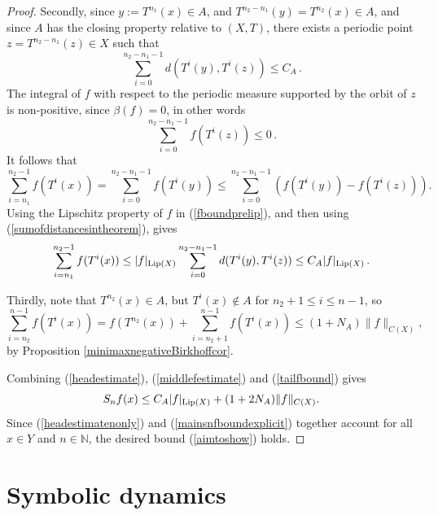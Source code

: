 \documentclass[reqno,11pt]{amsart}
\theoremstyle{definition}
\theoremstyle{remark}
\theoremstyle{remark}
\def \N {\mathbb N}
\def\lip{{\rm Lip}}
\numberwithin{equation}{section}
\begin{document}
\begin{proof}
Secondly, since $y:=T^{n_1}(x)\in A$, and $T^{n_2-n_1}(y)=T^{n_2}(x)\in A$,
and since $A$ has
the closing property relative to $(X,T)$, there exists a periodic point $z=T^{n_2-n_1}(z)\in X$ 
such that
\begin{equation}\label{sumofdistancesintheorem}
\sum_{i=0}^{n_2-n_1-1} d\left(T^i(y), T^i(z)\right) \le C_A\,.
\end{equation}
The integral of $f$ with respect to the periodic measure supported by the orbit of $z$ is non-positive,
since
$\beta(f)=0$,
in other words
\begin{equation}\label{gperiodicnonpositive}
\sum_{i=0}^{n_2-n_1-1}f(T^i(z)) \le 0\,.
\end{equation}
It follows that
\begin{equation}\label{fboundprelip}
\sum_{i=n_1}^{n_2-1} f(T^i(x))
=
\sum_{i=0}^{n_2-n_1-1} f(T^i(y))
\le
\sum_{i=0}^{n_2-n_1-1} \left(  f(T^i(y))-  f(T^i(z)) \right).
\end{equation}
Using the Lipschitz property of $f$  in (\ref{fboundprelip}),
and then using (\ref{sumofdistancesintheorem}),
 gives
\begin{equation}\label{middlefestimate}
\sum_{i=n_1}^{n_2-1} f(T^i(x))
\le |f|_{\lip(X)} 
\sum_{i=0}^{n_2-n_1-1} d(T^i(y),T^i(z))
\le  C_A  |f|_{\lip(X)}
 \,.
\end{equation}

Thirdly, note that $T^{n_2}(x)\in A$, but $T^i(x)\notin A$ for $n_2+1\le i\le n-1$,
so
\begin{equation}\label{tailfbound}
\sum_{i=n_2}^{n-1} f(T^i(x)) = f(T^{n_2}(x)) + \sum_{i=n_2+1}^{n-1}f(T^i(x)) \le (1+N_A) \|f\|_{C(X)},
\end{equation}
by Proposition \ref{minimaxnegativeBirkhoffcor}.

Combining (\ref{headestimate}), (\ref{middlefestimate}) and (\ref{tailfbound}) gives
\begin{equation}\label{mainsnfboundexplicit}
S_n f(x) \le C_A  |f|_{\lip(X)} + (1+2N_A) \|f\|_{C(X)}.
\end{equation}
Since (\ref{headestimatenonly}) and (\ref{mainsnfboundexplicit}) together account for all $x\in Y$ and $n\in\N$, 
the desired bound
(\ref{aimtoshow}) holds.
\end{proof}









\section{ Symbolic dynamics}\label{symbolicdynamicssection}
\end{document}
